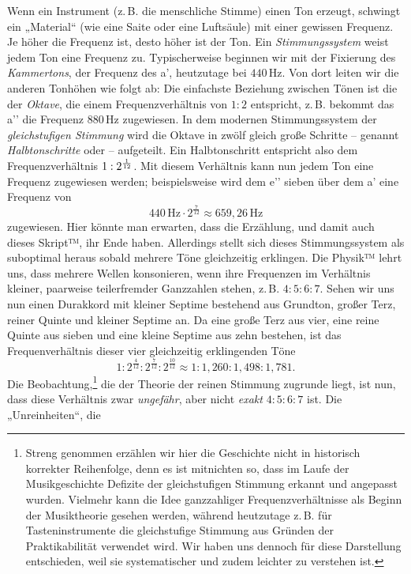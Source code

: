 \documentclass[ngerman,11pt]{scrartcl}
\begin{document}
Wenn ein Instrument (z.\,B. die menschliche Stimme) einen Ton erzeugt, schwingt
ein „Material“ (wie eine Saite oder eine Luftsäule) mit einer gewissen Frequenz.
Je höher die Frequenz ist, desto höher ist der Ton. Ein \emph{Stimmungssystem}
weist jedem Ton eine Frequenz zu. Typischerweise beginnen wir mit der Fixierung
des \emph{Kammertons}, der Frequenz des a’, heutzutage bei $440$\,Hz. Von dort
leiten wir die anderen Tonhöhen wie folgt ab: Die einfachste Beziehung zwischen
Tönen ist die der \emph{Oktave}, die einem Frequenzverhältnis von $1:2$
entspricht, z.\,B. bekommt das a’’ die Frequenz $880$\,Hz zugewiesen. In dem
modernen Stimmungssystem der \emph{gleichstufigen Stimmung} wird die Oktave in
zwölf gleich große Schritte – genannt \emph{Halbtonschritte} oder  – 
aufgeteilt. Ein Halbtonschritt entspricht also dem Frequenzverhältnis
$1:2^{\smash{\frac1{12}}}$. Mit diesem Verhältnis kann nun jedem Ton eine
Frequenz zugewiesen werden; beispielsweise wird dem e’’ sieben 
über dem a’ eine Frequenz von 
\[440\,\text{Hz}\cdot 2^{\frac7{12}} \approx 659{,}26\,\text{Hz}\]%
zugewiesen. Hier könnte man erwarten, dass die Erzählung, und damit auch dieses
Skript™, ihr Ende haben. Allerdings stellt sich dieses Stimmungssystem als
suboptimal heraus sobald mehrere Töne gleichzeitig erklingen. Die Physik™ lehrt
uns, dass mehrere Wellen konsonieren, wenn ihre Frequenzen im Verhältnis
kleiner, paarweise teilerfremder Ganzzahlen stehen, z.\,B. $4:5:6:7$. Sehen wir
uns nun einen Durakkord mit kleiner Septime bestehend aus Grundton, großer Terz,
reiner Quinte und kleiner Septime an. Da eine große Terz aus vier, eine reine
Quinte aus sieben und eine kleine Septime aus zehn  bestehen, ist das
Frequenverhältnis dieser vier gleichzeitig erklingenden Töne %
\[1:2^{\frac4{12}}:2^{\frac7{12}}:2^{\frac{10}{12}}\approx
  1:1{,}260:1{,}498:1{,}781.\]%
Die Beobachtung,\footnote{Streng genommen erzählen wir hier die Geschichte nicht
  in historisch korrekter Reihenfolge, denn es ist mitnichten so, dass im Laufe
  der Musikgeschichte Defizite der gleichstufigen Stimmung erkannt und angepasst
  wurden. Vielmehr kann die Idee ganzzahliger Frequenzverhältnisse als Beginn
  der Musiktheorie gesehen werden, während heutzutage z.\,B. für
  Tasteninstrumente die gleichstufige Stimmung aus Gründen der Praktikabilität
  verwendet wird. Wir haben uns dennoch für diese Darstellung entschieden, weil
  sie systematischer und zudem leichter zu verstehen ist.} die der Theorie der
reinen Stimmung zugrunde liegt, ist nun, dass diese Verhältnis zwar
\emph{ungefähr}, aber nicht \emph{exakt} $4:5:6:7$ ist. Die „Unreinheiten“, die
\end{document}
